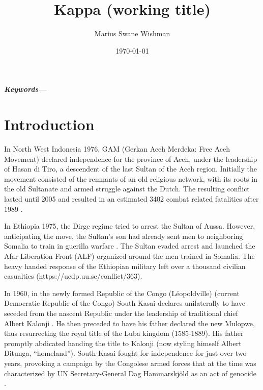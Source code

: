 \documentclass[12pt]{article}
\title{Kappa (working title)}
\author[1]{Marius Swane Wishman}
\affil[1]{Department of Sociology and Political Science, NTNU}
\date{\today}
\providecommand{\keywords}[1]
{
	\small	
	\textbf{\textit{Keywords---}} #1
}
\begin{document}
\maketitle



\begin{abstract}
\end{abstract}

\keywords{}

\pagebreak


\onehalfspacing

\section{Introduction}

In North West Indonesia 1976, GAM (Gerkan Aceh Merdeka: Free Aceh Movement)
declared independence for the province of Aceh, under the leadership of Hasan di
Tiro, a descendent of the last Sultan of the Aceh region. Initially the movement
consisted of the remnants of an old religious network, with its roots in the old
Sultanate and armed struggle against the Dutch. The resulting
conflict lasted until 2005 and resulted in an estimated 3402 combat related
fatalities after 1989 \citep{Aspinall2009, Pettersson2018, Sundberg2013}.

In Ethiopia 1975, the Dirge regime tried to arrest the Sultan of Aussa. However,
anticipating the move, the Sultan's son had already sent men to neighboring
Somalia to train in guerilla warfare \citep{Shehim1985}. The Sultan evaded
arrest and launched the Afar Liberation Front (ALF) organized around the men
trained in Somalia. The heavy handed response of the Ethiopian military left
over a thousand civilian casualties (https://ucdp.uu.se/conflict/363).

In 1960, in the newly formed Republic of the Congo (Léopoldville) (current
Democratic Republic of the Congo) South Kasai declares unilaterally to have
seceded from the nascent Republic under the leadership of traditional chief
Albert Kalonji \citep{Nzongola2002}. He then preceded to have his father
declared the new Mulopwe, thus resurrecting the royal title of the Luba kingdom
(1585-1889). His father promptly abdicated handing the title to Kalonji (now
styling himself Albert Ditunga, ``homeland''). South Kasai fought for independence
for just over two years, provoking a campaign by the Congolese armed forces that
at the time was characterized by UN Secretary-General Dag Hammarskjöld as an act
of genocide \citep{Nzongola2002}.
\end{document}

